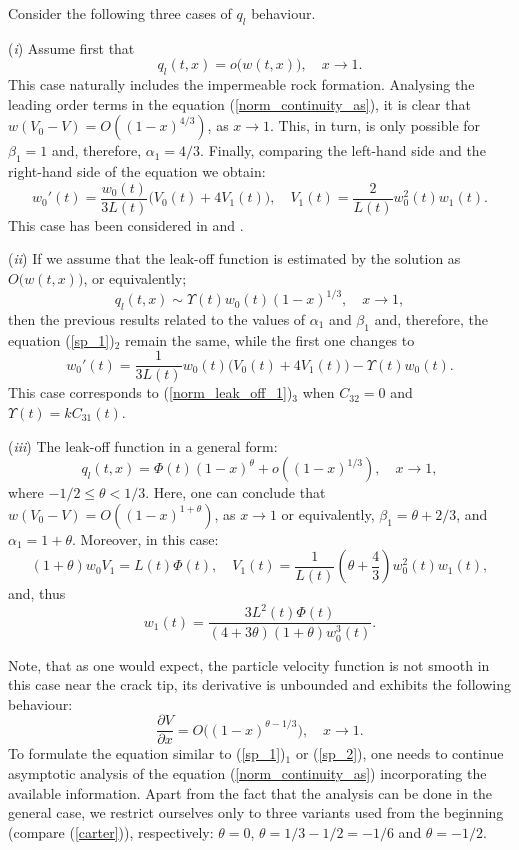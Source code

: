 \noindent Consider the following three cases of $q_l$ behaviour.

(\emph{i}) Assume first that
\[
q_l(t,x)=o\big(w(t,x)\big),\quad x\to1.
\]
This case naturally includes the impermeable rock formation. Analysing the leading order terms in the equation (\ref{norm_continuity_as}), it is clear that $w(V_0-V)=O((1-x)^{4/3})$, as $x\to1$. This, in turn, is only possible for $\beta_1=1$ and, therefore, $\alpha_1=4/3$. Finally, comparing the left-hand side and the right-hand side of the equation we obtain:
\begin{equation}
w_{0}'(t)= \frac{w_{0}(t)}{3L(t)} \big(V_0(t)+4V_1(t)\big),\quad V_{1}(t)=\frac{2}{L(t)}w_{0}^{2}(t) w_{1}(t).
\label{sp_1}
\end{equation}
This case has been considered in \cite{Linkov_4} and \cite{MWL}.

\vspace{2mm}


(\emph{ii})
If we assume that the leak-off function is estimated by the solution as  $O\big(w(t,x)\big)$, or equivalently;
\[
q_l(t,x)\sim\Upsilon(t)w_0(t)(1-x)^{1/3},\quad x\to1,
\]
then the previous results related to the values of $\alpha_1$ and $\beta_1$ and, therefore, the equation (\ref{sp_1})$_2$ remain the same, while the first one changes to
\begin{equation}
w_{0}'(t)= \frac{1}{3L(t)} w_{0}(t)\big(V_0(t)+4V_1(t)\big)-\Upsilon(t)w_0(t).
\label{sp_2}
\end{equation}
This case corresponds to (\ref{norm_leak_off_1})$_3$ when $C_{32}=0$ and $\Upsilon(t)=kC_{31}(t)$.

\vspace{2mm}


(\emph{iii})
The leak-off function in a general form:
\[
q_l(t,x)=\Phi(t)(1-x)^{\theta}+o((1-x)^{1/3}),\quad x\to1,
\]
where $-1/2\le \theta<1/3$. Here, one can conclude that $w(V_0-V)=O((1-x)^{1+\theta})$, as $x\to1$ or equivalently, $\beta_1=\theta+2/3$, and $\alpha_1=1+\theta$. Moreover, in this case:
\begin{equation}
(1+\theta)w_0V_1=L(t)\Phi(t), \quad V_{1}(t)=\frac{1}{L(t)}\left(\theta+\frac{4}{3}\right) w_{0}^{2}(t) w_{1}(t),
\label{sp_3}
\end{equation}
and, thus
\begin{equation}
w_{1}(t)=\frac{3L^2(t)\Phi(t)}{(4+3\theta)(1+\theta)w_{0}^{3}(t)}.
\label{sp_3a}
\end{equation}

Note, that as one would expect, the particle velocity function is not smooth in this case near the crack tip, its derivative is unbounded and exhibits the following behaviour:
\[
\frac{\partial V}{\partial x}=O\big((1-x)^{\theta-1/3}\big), \quad x\to1.
\]
To formulate the equation similar to (\ref{sp_1})$_1$ or (\ref{sp_2}), one needs to continue asymptotic analysis of the equation (\ref{norm_continuity_as}) incorporating the available information.
Apart from the fact that the analysis can be done in the general case, we restrict ourselves only to three variants used from the beginning (compare (\ref{carter})), respectively:
$\theta=0$, $\theta=1/3-1/2=-1/6$ and $\theta=-1/2$.





